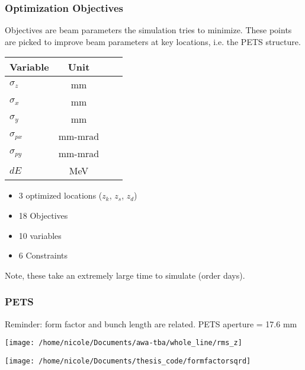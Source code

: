 \documentclass[professionalfonts,t]{beamer}
\begin{document}
\begin{frame}
\frametitle{Optimization Objectives}
Objectives are beam parameters the simulation tries to minimize.
These points are picked to improve beam parameters at key locations, 
i.e. the PETS structure.

\vspace{1em}
\begin{minipage}{0.45\textwidth}
	\begin{table}[hbt] 
		\centering
		\begin{tabular}{ l *{3}{c}}
			\toprule
			\textbf{Variable} &  \textbf{Unit} \\
			\midrule
			$\sigma_z$ 		& mm \\
			$\sigma_{x}$ 	& mm \\
			$\sigma_y$ 		& mm \\
			$\sigma_{px}$ 	& mm-mrad \\
			$\sigma_{py}$ 	& mm-mrad \\
			$dE$			& MeV\\
			\bottomrule	
		\end{tabular}	
	\end{table}
\end{minipage}
\begin{minipage}{0.45\textwidth}
	\begin{itemize}
		\item 3 optimized locations ($z_k$, $z_s$, $z_d$)
		\item 18 Objectives
		\item 10 variables 
		\item 6 Constraints
	\end{itemize}
\end{minipage}
\centering
Note, these take an extremely large time to simulate (order days).
\end{frame}


\begin{frame}
\frametitle{PETS}
Reminder: form factor and bunch length are related. PETS aperture = 17.6 mm

\begin{minipage}{0.49\textwidth}
\texttt{[image: /home/nicole/Documents/awa-tba/whole\_line/rms\_z]}
\end{minipage}
\begin{minipage}{0.49\textwidth}

\centering
\texttt{[image: /home/nicole/Documents/thesis\_code/formfactorsqrd]}
\end{minipage}
\end{frame}
\end{document}
